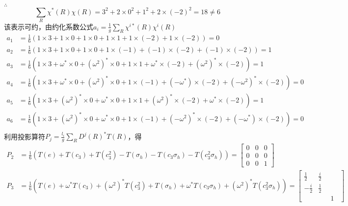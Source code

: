 \documentclass[12pt]{article}
\numberwithin{equation}{section}	 %
\begin{document}
\begin{spacing}{1.5}
$\therefore$
\begin{equation}\nonumber 		%
\sum_{R}\chi^{*}(R)\chi(R) = 3^{2} + 2\times0^{2} + 1^{2} + 2\times(-2)^{2} = 18 \ne 6
\end{equation}
该表示可约，由约化系数公式$\displaystyle a_{i} = \frac{1}{g}\sum_{R}\chi^{i*}(R)\chi^{i}(R)$
\begin{align*}
a_{1} &= \frac{1}{6}\left( 1\times3 + 1\times0 + 1\times0 + 1\times1 + 1\times(-2) + 1\times(-2) \right) = 0 \\
a_{2} &= \frac{1}{6}\left( 1\times3 + 1\times0 + 1\times0 + 1\times(-1) + (-1)\times(-2) + (-1)\times(-2) \right) = 1 \\
a_{3} &= \frac{1}{6}\left( 1\times3 + \omega^{*}\times0 + (\omega^{2})^{*}\times0 + 1\times1 + \omega^{*}\times(-2) + (\omega^{2})^{*}\times(-2) \right) = 1 \\
a_{4} &= \frac{1}{6}\left( 1\times3 + \omega^{*}\times0 + (\omega^{2})^{*}\times0 + 1\times(-1) + (-\omega^{*})\times(-2) + (-\omega^{2})^{*}\times(-2) \right) = 0 \\
a_{5} &= \frac{1}{6}\left( 1\times3 + (\omega^{2})^{*}\times0 + \omega^{*}\times0 + 1\times1 + (\omega^{2})^{*}\times(-2) + \omega^{*}\times(-2) \right) = 1 \\
a_{6} &= \frac{1}{6}\left( 1\times3 + (\omega^{2})^{*}\times0 + \omega^{*}\times0 + 1\times(-1) + (-\omega^{2})^{*}\times(-2) + (-\omega^{*})\times(-2) \right) = 0 \\
\end{align*}
利用投影算符$\displaystyle P_{j} = \frac{l_{i}}{g} \sum_{R} D^{j}(R)^{*} T(R)$，得
\begin{align*}
P_{2} &= \frac{1}{6}\left( T(e) + T(c_{3}) + T(c_{3}^{2}) - T(\sigma_{h}) - T(c_{3}\sigma_{h}) - T(c_{3}^{2}\sigma_{h}) \right) = \begin{bmatrix} 0 & 0 & 0 \\ 0 & 0 & 0 \\ 0 & 0 & 1\end{bmatrix} \\
P_{3} &= \frac{1}{6}\left( T(e) + \omega^{*}T(c_{3}) + (\omega^{2})^{*}T(c_{3}^{2}) + T(\sigma_{h}) + \omega^{*}T(c_{3}\sigma_{h}) + (\omega^{2})^{*}T(c_{3}^{2}\sigma_{h}) \right) = \begin{bmatrix} \frac{1}{2} & \frac{i}{2} & \quad \\ -\frac{i}{2} & \frac{1}{2} & \quad \\ \quad & \quad & 1\end{bmatrix} \\

\end{align*}
\end{spacing}
\end{document}
